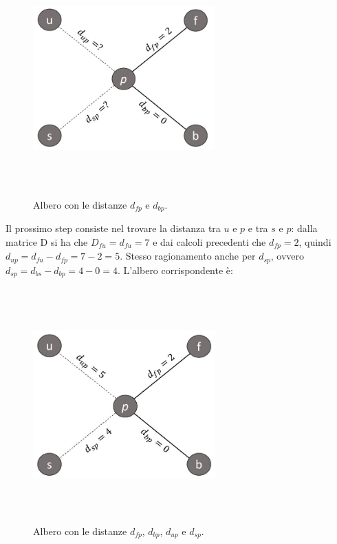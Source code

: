 \begin{figure}[h!]
\centering
	\includegraphics[height=9cm, width=7cm, keepaspectratio]{distance_between_f_b_part_3.jpg}
 	\caption{Albero con le distanze $d_{fp}$ e $d_{bp}$.}
  	\label{fig:neighborsleaves_3}
\end{figure}
\newline
Il prossimo step consiste nel trovare la distanza tra $u$ e $p$ e tra $s$ e $p$: dalla matrice D si ha che $D_{fu}=d_{fu}=7$ e dai calcoli precedenti che $d_{fp}=2$, quindi $d_{up}=d_{fu}-d_{fp}=7-2=5$. Stesso ragionamento anche per $d_{sp}$, ovvero $d_{sp}=d_{bs}-d_{bp}=4-0=4$.
\newline
L'albero corrispondente è:
\newpage
\begin{figure}[h!]
\centering
	\includegraphics[height=9cm, width=7cm, keepaspectratio]{distance_between_f_b_part_4.jpg}
 	\caption{Albero con le distanze $d_{fp}$, $d_{bp}$, $d_{up}$ e $d_{sp}$.}
  	\label{fig:neighborsleaves_3}
\end{figure}
